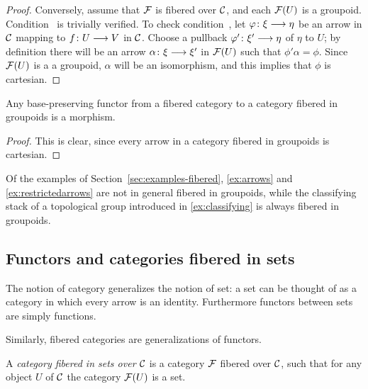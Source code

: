 \begin{3   FIBERED CATEGORIES}
\begin{3.3 Categories fibered in groupoids}
\begin{proof}
Conversely, assume that $\mathcal{F}$ is fibered over $\mathcal{C}$, and each $\mathcal{F}(U)$ is a groupoid. Condition~ is trivially verified. To check condition~, let $\phi\colon \xi \arr \eta$ be an arrow in $\mathcal{C}$ mapping to $f \colon U \arr V$ in $\mathcal{C}$. Choose a pullback $\phi'\colon \xi' \arr \eta$ of $\eta$ to $U$; by definition there will be an arrow $\alpha \colon \xi \arr \xi'$ in $\mathcal{F}(U)$ such that $\phi'\alpha = \phi$. Since $\mathcal{F}(U)$ is a a groupoid, $\alpha$ will be an isomorphism, and this implies that $\phi$ is cartesian.
\end{proof}


\begin{corollary} Any base-preserving functor from a fibered category to a category fibered in groupoids is a morphism.
\end{corollary}

\begin{proof} This is clear, since every arrow in a category fibered in groupoids is cartesian.
\end{proof}

Of the examples of Section~\ref{sec:examples-fibered}, \ref{ex:arrows} and \ref{ex:restrictedarrows} are not in general fibered in groupoids, while the classifying stack of a topological group introduced in \ref{ex:classifying} is always fibered in groupoids.



\end{3.3 Categories fibered in groupoids}
\begin{3.4 Functors and cats fibered in sets}
\setcounter{section}{3}
\section{Functors and categories fibered in sets}\label{sec:fiberedsets}

The notion of category generalizes the notion of set: a set can be thought of as a category in which every arrow is an identity. Furthermore functors between sets are simply functions.

Similarly, fibered categories are generalizations of functors.

\begin{definition} A \emph{category fibered in sets over $\mathcal{C}$} is a category $\mathcal{F}$ fibered over $\mathcal{C}$, such that for any object $U$ of $\mathcal{C}$ the category $\mathcal{F}(U)$ is a set.
\end{definition}


\end{3.4 Functors and cats fibered in sets}
\end{3   FIBERED CATEGORIES}
